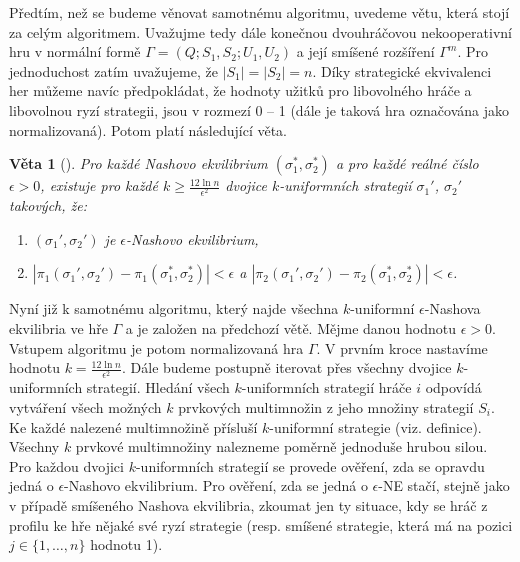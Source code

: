 \documentclass[a4paper,12pt]{article}
\newtheorem{theorem}{Věta}
\begin{document}
Předtím, než se budeme věnovat samotnému algoritmu, uvedeme větu, která stojí za celým algoritmem. Uvažujme tedy dále konečnou dvouhráčovou nekooperativní hru v normální formě 
$\Gamma = (Q;S_1,S_2;U_1, U_2)$ a její smíšené rozšíření $\Gamma^m$. Pro jednoduchost zatím uvažujeme, že $|S_1| = |S_2| = n$. Díky strategické ekvivalenci her můžeme 
navíc předpokládat, že hodnoty užitků pro libovolného hráče a libovolnou ryzí strategii, 
jsou v rozmezí 0 -- 1 (dále je taková hra označována jako normalizovaná). Potom platí následující věta.

\begin{theorem}[\cite{Lipton:2003:PLG:779928.779933}]\label{the:eps}
 Pro každé Nashovo ekvilibrium $(\sigma_1^*, \sigma_2^*)$ a pro každé reálné číslo $\epsilon > 0$, existuje pro každé $k \geq \frac{12\ln n}{\epsilon ^2}$
 dvojice $k$-uniformních strategií $\sigma_1'$, $\sigma_2'$ takových, že: 
 \begin{enumerate}
    \item $(\sigma_1', \sigma_2')$ je $\epsilon$-Nashovo ekvilibrium,
    \item $|\pi_1(\sigma_1', \sigma_2') -\pi_1(\sigma_1^*, \sigma_2^*) | < \epsilon$ a $|\pi_2(\sigma_1', \sigma_2') -\pi_2(\sigma_1^*, \sigma_2^*) | < \epsilon$.
 \end{enumerate}
\end{theorem}

Nyní již k samotnému algoritmu, který najde všechna $k$-uniformní $\epsilon$-Nashova ekvilibria ve hře $\Gamma$ a je založen na předchozí větě. Mějme danou hodnotu $\epsilon > 0$. Vstupem algoritmu 
je potom normalizovaná hra $\Gamma$. V prvním kroce nastavíme hodnotu $k = \frac{12\ln n}{\epsilon ^2}$. Dále budeme postupně iterovat přes všechny dvojice $k$-uniformních strategií. Hledání
všech $k$-uniformních strategií hráče $i$ odpovídá vytváření všech možných $k$ prvkových multimnožin z jeho množiny strategií $S_i$. Ke každé nalezené multimnožině přísluší 
$k$-uniformní strategie (viz. definice). Všechny $k$ prvkové multimnožiny nalezneme poměrně jednoduše hrubou silou. Pro každou dvojici 
$k$-uniformních strategií se provede ověření, zda se opravdu jedná o $\epsilon$-Nashovo ekvilibrium. Pro ověření, zda se jedná o $\epsilon$-NE stačí, 
stejně jako v případě smíšeného Nashova ekvilibria, zkoumat jen ty situace, kdy se hráč z profilu  ke hře nějaké své ryzí strategie (resp. smíšené strategie, která 
má na pozici $j\in\{1,\dots,n\}$ hodnotu 1). 
\end{document}
